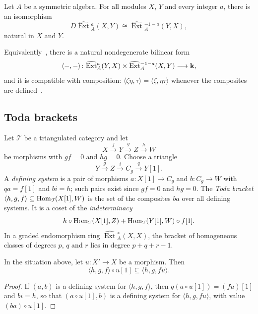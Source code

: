 \begin{theorem}
  \label{thm:tate-duality}
  Let $A$ be a symmetric algebra. For all modules $X$, $Y$ and every integer
  $a$, there is an isomorphism
  \[
    D\widehat{\operatorname{Ext}}{}^a_A(X,Y)\cong
    \widehat{\operatorname{Ext}}{}^{-1-a}_A(Y,X),
  \]
  natural in $X$ and $Y$.
\end{theorem}

Equivalently~\cite[Section~2, (2.2)]{Lin13}, there is a natural nondegenerate
bilinear form
\[
  \langle-,-\rangle\colon\widehat{\operatorname{Ext}}{}^{a}_A(Y,X)\times
  \widehat{\operatorname{Ext}}{}^{-1-a}_A(X,Y)\longrightarrow\mathbf{k},
\]
and it is compatible with composition: ${\langle\zeta\eta,\tau\rangle=
\langle\zeta,\eta\tau\rangle}$ whenever the composites are
defined~\cite[Section~2, (2.8)]{Lin13}.

\subsection{Toda brackets}
\label{subsec:toda}

Let $\mathcal{T}$ be a triangulated category and let
\[
  X\xrightarrow{f}Y\xrightarrow{g}Z\xrightarrow{h}W
\]
be morphisms with ${gf=0}$ and ${hg=0}$. Choose a triangle
\[
  Y\xrightarrow{g}Z\xrightarrow{i}C_g\xrightarrow{q}Y[1].
\]
A \emph{defining
system} is a pair of morphisms ${a\colon X[1]\to C_g}$ and ${b\colon C_g\to W}$ with
${qa=f[1]}$ and ${bi=h}$; such pairs exist since ${gf=0}$ and ${hg=0}$. The
\emph{Toda bracket} ${\langle h,g,f\rangle\subseteq\Hom[\mathcal{T}]{X[1]}{W}}$
is the set of the composites $ba$ over all defining systems. It is a coset of
the \emph{indeterminacy}
\[
  h\circ\Hom[\mathcal{T}]{X[1]}{Z}+\Hom[\mathcal{T}]{Y[1]}{W}\circ f[1].
\]
In a graded endomorphism ring $\widehat{\operatorname{Ext}}{}^*_A(X,X)$, the
bracket of homogeneous classes of degrees $p$, $q$ and $r$ lies in degree
${p+q+r-1}$.

\begin{lemma}
  \label{lemma:toda-juggling}
  In the situation above, let ${u\colon X'\to X}$ be a morphism. Then
  \[
    \langle h,g,f\rangle\circ u[1]\subseteq\langle h,g,fu\rangle.
  \]
\end{lemma}

\begin{proof}
  If $(a,b)$ is a defining system for $\langle h,g,f\rangle$, then
  ${q(a\circ u[1])=(fu)[1]}$ and ${bi=h}$, so that ${(a\circ u[1],b)}$ is a defining
  system for $\langle h,g,fu\rangle$, with value ${(ba)\circ u[1]}$.
\end{proof}

